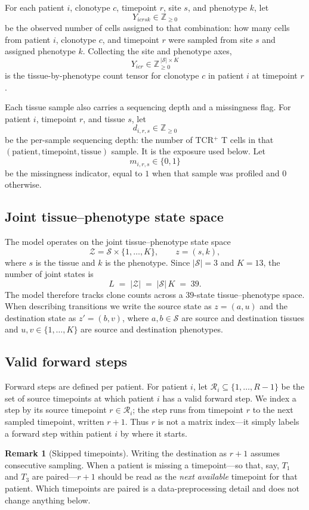 \documentclass[11pt]{article}
\newcommand{\Znn}{\mathbb{Z}_{\geq 0}}            %
\newcommand{\Zsp}{\mathcal{Z}}                    %
\newcommand{\Ssp}{\mathcal{S}}                    %
\newcommand{\Rsp}{\mathcal{R}}                    %
\theoremstyle{definition}
\newtheorem*{remark}{Remark}
\begin{document}
For each patient $i$, clonotype $c$, timepoint $r$, site $s$, and phenotype
$k$, let
\[
  Y_{icrsk} \in \Znn
\]
be the observed number of cells assigned to that combination: how many cells
from patient $i$, clonotype $c$, and timepoint $r$ were sampled from site $s$
and assigned phenotype $k$. Collecting the site and phenotype axes,
\[
  Y_{icr} \in \Znn^{\,|\Ssp| \times K}
\]
is the tissue-by-phenotype count tensor for clonotype $c$ in patient $i$ at
timepoint $r$.

Each tissue sample also carries a sequencing depth and a missingness flag. For
patient $i$, timepoint $r$, and tissue $s$, let
\[
  d_{i,r,s} \in \Znn
\]
be the per-sample sequencing depth: the number of TCR$^+$ T cells in that
$(\text{patient},\text{timepoint},\text{tissue})$ sample. It is the exposure used below. Let
\[
  m_{i,r,s} \in \{0,1\}
\]
be the missingness indicator, equal to $1$ when that sample was profiled and
$0$ otherwise.

\subsection{Joint tissue--phenotype state space}

The model operates on the joint tissue--phenotype state space
\[
  \Zsp = \Ssp \times \{1,\ldots,K\},
  \qquad
  z = (s,k),
\]
where $s$ is the tissue and $k$ is the phenotype. Since $|\Ssp| = 3$ and
$K = 13$, the number of joint states is
\[
  L \;=\; |\Zsp| \;=\; |\Ssp|\,K \;=\; 39 .
\]
The model therefore tracks clone counts across a $39$-state
tissue--phenotype space. When describing transitions we write the source state
as $z = (a,u)$ and the destination state as $z' = (b,v)$, where $a,b \in \Ssp$
are source and destination tissues and $u,v \in \{1,\ldots,K\}$ are source and
destination phenotypes.

\subsection{Valid forward steps}

Forward steps are defined per patient. For patient $i$, let
$\Rsp_i \subseteq \{1,\ldots,R-1\}$ be the set of source timepoints at which
patient $i$ has a valid forward step. We index a step by its source timepoint
$r \in \Rsp_i$; the step runs from timepoint $r$ to the next sampled timepoint,
written $r+1$. Thus $r$ is not a matrix index---it simply labels a forward step
within patient $i$ by where it starts.

\begin{remark}[Skipped timepoints]
Writing the destination as $r+1$ assumes consecutive sampling. When a patient is
missing a timepoint---so that, say, $T_1$ and $T_3$ are paired---$r+1$ should be
read as the \emph{next available} timepoint for that patient. Which timepoints
are paired is a data-preprocessing detail and does not change anything below.
\end{remark}
\end{document}
